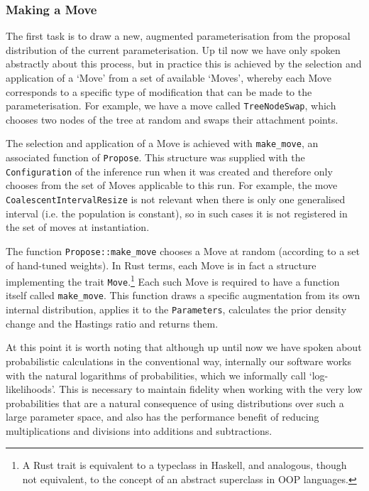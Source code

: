 \documentclass[10pt,journal,compsoc]{IEEEtran}
\begin{document}
\subsubsection{Making a Move}

The first task is to draw a new, augmented parameterisation from the proposal distribution of the current parameterisation. Up til now we have only spoken abstractly about this process, but in practice this is achieved by the selection and application of a `Move' from a set of available `Moves', whereby each Move corresponds to a specific type of modification that can be made to the parameterisation. For example, we have a move called \texttt{TreeNodeSwap}, which chooses two nodes of the tree at random and swaps their attachment points.

The selection and application of a Move is achieved with \texttt{make\_move}, an associated function of \texttt{Propose}. This structure was supplied with the \texttt{Configuration} of the inference run when it was created and therefore only chooses from the set of Moves applicable to this run. For example, the move \texttt{CoalescentIntervalResize} is not relevant when there is only one generalised interval (i.e. the population is constant), so in such cases it is not registered in the set of moves at instantiation.

The function \texttt{Propose::make\_move} chooses a Move at random (according to a set of hand-tuned weights). In Rust terms, each Move is in fact a structure implementing the trait \texttt{Move}.\footnote{A Rust trait is equivalent to a typeclass in Haskell, and analogous, though not equivalent, to the concept of an abstract superclass in OOP languages.} Each such Move is required to have a function itself called \texttt{make\_move}. This function draws a specific augmentation from its own internal distribution, applies it to the \texttt{Parameters}, calculates the prior density change and the Hastings ratio and returns them.

At this point it is worth noting that although up until now we have spoken about probabilistic calculations in the conventional way, internally our software works with the natural logarithms of probabilities, which we informally call `log-likelihoods'. This is necessary to maintain fidelity when working with the very low probabilities that are a natural consequence of using distributions over such a large parameter space, and also has the performance benefit of reducing multiplications and divisions into additions and subtractions.
\end{document}
